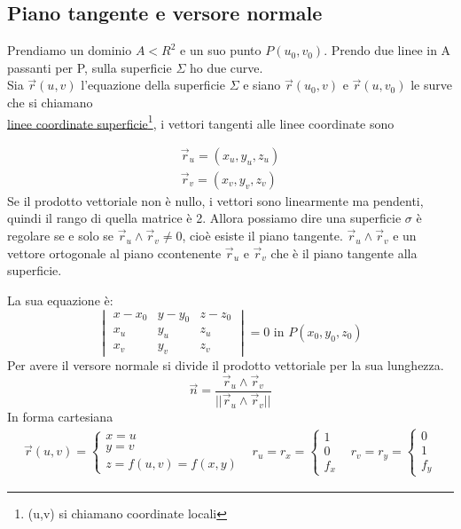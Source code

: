 \subsection{Piano tangente e versore normale}
Prendiamo un dominio $A<R^2$ e un suo punto $P(u_0,v_0)$. Prendo due linee in A
passanti per P, sulla superficie $\Sigma$ ho due curve.\\
Sia $\vec{r}(u,v)$ l'equazione della superficie $\Sigma$ e siano
$\vec{r}(u_0,v)$  e $\vec{r}(u,v_0)$ le surve che si chiamano\\ \underline{linee
coordinate superficie}\footnote{(u,v) si chiamano coordinate locali}, i vettori
tangenti alle linee coordinate sono 
\begin{multicols}{2}
	\begin{equation*}
	\begin{matrix}
		\vec{r}_u=(x_u,y_u,z_u)\\
		\vec{r}_v=(x_v,y_v,z_v)
	\end{matrix}
	\end{equation*}
	Se il prodotto vettoriale non è nullo, i vettori sono linearmente ma
	pendenti, quindi il rango di quella matrice è 2. Allora possiamo dire una
	superficie $\sigma$ è regolare se e solo se $\vec{r}_u\wedge \vec{r}_v\neq
	0$, cioè esiste il {\color{red}piano tangente}. $\vec{r}_u\wedge \vec{r}_v$
	e un vettore ortogonale al piano ccontenente $\vec{r}_u$ e $\vec{r}_v$ che
	è il {\color{red}piano tangente} alla superficie.
\end{multicols}
La sua equazione è:\begin{equation*}
	\begin{vmatrix}
		x-x_0 & y-y_0 & z-z_0\\
		x_u & y_u & z_u\\
		x_v & y_v & z_v
	\end{vmatrix} =0\text{ in }P(x_0,y_0,z_0)
\end{equation*}
Per avere il {\color{red}versore normale} si divide il prodotto vettoriale per
la sua lunghezza.
\begin{equation*}
	\vec{n}=\frac{\vec{r}_u \wedge \vec{r}_v}{||\vec{r}_u\wedge \vec{r}_v||}
\end{equation*}
In forma cartesiana
\begin{equation*}
	\begin{matrix}
		\vec{r}(u, v) = \begin{cases}
			x=u\\
			y=v\\
			z=f(u, v)=f(x,y) 
		\end{cases}&r_u=r_x=\begin{cases}
			1 \\
			0\\
			f_x
		\end{cases} & r_v=r_y=\begin{cases}
			0\\
			1\\
			f_y
		\end{cases}
	\end{matrix}
\end{equation*}
